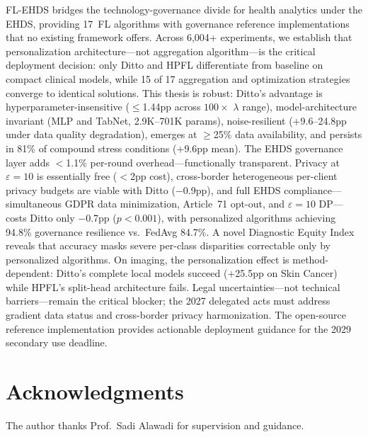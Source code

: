 \documentclass[conference]{IEEEtran}
\begin{document}
FL-EHDS bridges the technology-governance divide for health analytics under the EHDS, providing 17~FL algorithms with governance reference implementations that no existing framework offers. Across 6,004+ experiments, we establish that personalization architecture---not aggregation algorithm---is the critical deployment decision: only Ditto and HPFL differentiate from baseline on compact clinical models, while 15 of 17 aggregation and optimization strategies converge to identical solutions. This thesis is robust: Ditto's advantage is hyperparameter-insensitive ($\leq$1.44pp across $100\times$ $\lambda$ range), model-architecture invariant (MLP and TabNet, 2.9K--701K params), noise-resilient ($+$9.6--24.8pp under data quality degradation), emerges at $\geq$25\% data availability, and persists in 81\% of compound stress conditions ($+$9.6pp mean). The EHDS governance layer adds $<$1.1\% per-round overhead---functionally transparent. Privacy at $\varepsilon{=}10$ is essentially free ($<$2pp cost), cross-border heterogeneous per-client privacy budgets are viable with Ditto ($-$0.9pp), and full EHDS compliance---simultaneous GDPR data minimization, Article~71 opt-out, and $\varepsilon{=}10$ DP---costs Ditto only $-$0.7pp ($p{<}0.001$), with personalized algorithms achieving 94.8\% governance resilience vs.\ FedAvg 84.7\%. A novel Diagnostic Equity Index reveals that accuracy masks severe per-class disparities correctable only by personalized algorithms. On imaging, the personalization effect is method-dependent: Ditto's complete local models succeed ($+$25.5pp on Skin Cancer) while HPFL's split-head architecture fails. Legal uncertainties---not technical barriers---remain the critical blocker; the 2027 delegated acts must address gradient data status and cross-border privacy harmonization. The open-source reference implementation provides actionable deployment guidance for the 2029 secondary use deadline.

\section*{Acknowledgments}
The author thanks Prof.~Sadi Alawadi for supervision and guidance.


\end{document}
